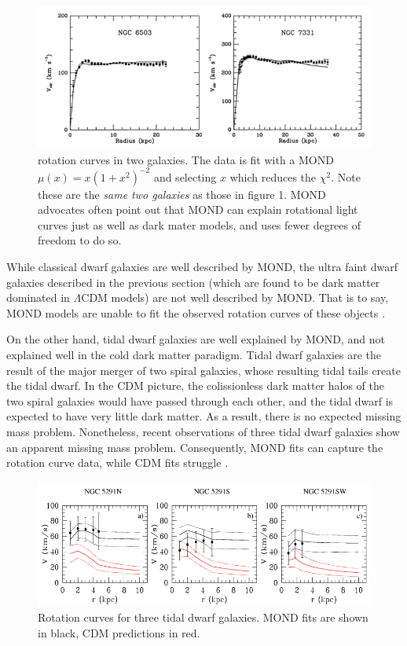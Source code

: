 \documentclass[12pt]{article}
\begin{document}
\begin{figure}
\centering
\includegraphics[width=5in]{mondRotation.png}
\caption{rotation curves in two galaxies. The data is fit with a MOND $\mu(x) = x(1+x^{2})^{-2}$ and selecting $x$ which reduces the $\chi^{2}$. Note these are the \emph{same two galaxies} as those in figure 1. MOND advocates often point out that MOND can explain rotational light curves just as well as dark mater models, and uses fewer degrees of freedom to do so. \cite{Begeman1991}}
\end{figure}

While classical dwarf galaxies are well described by MOND, the ultra faint dwarf galaxies described in the previous section (which are found to be dark matter dominated in $\Lambda$CDM models) are not well described by MOND. That is to say, MOND models are unable to fit the observed rotation curves of these objects \cite{Famaey2012}. 

On the other hand, tidal dwarf galaxies are well explained by MOND, and not explained well in the cold dark matter paradigm. Tidal dwarf galaxies are the result of the major merger of two spiral galaxies, whose resulting tidal tails create the tidal dwarf. In the CDM picture, the colissionless dark matter halos of the two spiral galaxies would have passed through each other, and the tidal dwarf is expected to have very little dark matter. As a result, there is no expected missing mass problem. Nonetheless, recent observations of three tidal dwarf galaxies show an apparent missing mass problem. Consequently, MOND fits can capture the rotation curve data, while CDM fits struggle \cite{Bournaud2007}. 

\begin{figure}
\centering
\includegraphics[width=6in]{tidalDwarf.png}
\caption{Rotation curves for three tidal dwarf galaxies. MOND fits are shown in black, CDM predictions in red. \cite{Bournaud2007}}
\end{figure}
\end{document}
